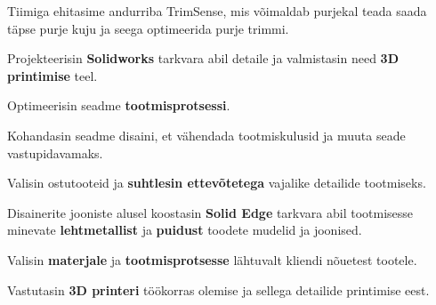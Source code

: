 \documentclass[letterpaper]{deedy-resume} %
\begin{document}
\begin{minipage}[t]{0.66\textwidth}
\sectionspace %



\begin{tightitemize}
  \item Tiimiga ehitasime andurriba TrimSense, mis võimaldab purjekal teada saada täpse purje kuju ja seega optimeerida purje trimmi.
  \item Projekteerisin \textbf{Solidworks} tarkvara abil detaile ja valmistasin need \textbf{3D printimise} teel.
  \item Optimeerisin seadme \textbf{tootmisprotsessi}.
  \item Kohandasin seadme disaini, et vähendada tootmiskulusid ja muuta seade vastupidavamaks.
  \item Valisin ostutooteid ja \textbf{suhtlesin ettevõtetega} vajalike detailide tootmiseks.
\end{tightitemize}

\sectionspace %




\begin{tightitemize}
  \item Disainerite jooniste alusel koostasin \textbf{Solid Edge} tarkvara abil tootmisesse minevate \textbf{lehtmetallist} ja \textbf{puidust} toodete mudelid ja joonised.
  \item Valisin \textbf{materjale} ja \textbf{tootmisprotsesse} lähtuvalt kliendi nõuetest tootele.
  \item Vastutasin \textbf{3D printeri} töökorras olemise ja sellega detailide printimise eest.
\end{tightitemize}

\sectionspace %



\end{minipage}
\end{document}
